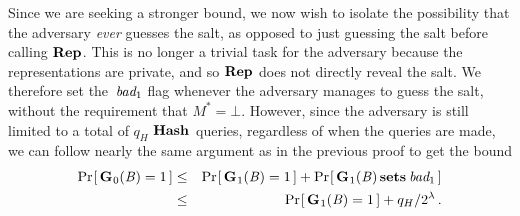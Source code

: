 Since we are seeking a stronger bound, we now wish to isolate the possibility that the adversary \emph{ever} guesses the salt, as opposed to just guessing the salt before calling $\textup{\textbf{Rep}}\hspace{0.5pt}$. This is no longer a trivial task for the adversary because the representations are private, and so $\textup{\textbf{Rep}}\hspace{0.5pt}$ does not directly reveal the salt. We therefore set the~$\textit{bad}_1$ flag whenever the adversary manages to guess the salt, without the requirement that $M^* = \bot$. However, since the adversary is still limited to a total of $q_H$ $\textup{\textbf{Hash}}\hspace{0.5pt}$ queries, regardless of when the queries are made, we can follow nearly the same argument as in the previous proof to get the bound
%
\begin{eqnarray}
  \Pr\hspace{-1pt}\left[\,\textup{\textbf{G}}\hspace{0.5pt}_0(\mathit{B})=1\,\right] &\leq&
    \Pr\hspace{-1pt}\left[\,\textup{\textbf{G}}\hspace{0.5pt}_1(\mathit{B})=1\,\right] + \Pr\hspace{-1pt}\left[\,\textup{\textbf{G}}\hspace{0.5pt}_1(\mathit{B}) \,\textup{\textbf{sets}}\hspace{0.5pt}\, \textit{bad}_1\,\right]\\
  &\leq&
    \Pr\hspace{-1pt}\left[\,\textup{\textbf{G}}\hspace{0.5pt}_1(\mathit{B})=1\,\right] + q_H/2^\lambda \,.
\end{eqnarray}
%



